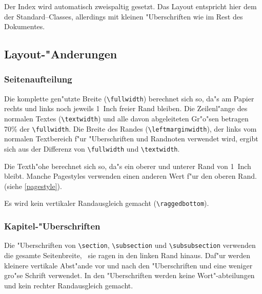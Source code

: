 Der Index wird automatisch zweispaltig gesetzt. Das Layout entspricht 
hier dem der Standard--Classes, allerdings mit kleinen "Uberschriften 
wie im Rest des Dokumentes.

\subsection{Layout-"Anderungen}

\subsubsection{Seitenaufteilung}

Die komplette gen"utzte Breite (\verb|\fullwidth|) berechnet 
sich so, da"s am Papier rechts und links noch jeweils 1~Inch 
freier Rand bleiben. Die Zeilenl"ange des normalen Textes 
(\verb|\textwidth|) und alle davon abgeleiteten Gr"o"sen 
betragen 70\% der \verb|\fullwidth|. Die Breite des Randes 
(\verb|\leftmarginwidth|), der links vom normalen Textbereich 
f"ur "Uberschriften und Randnoten verwendet wird, ergibt sich 
aus der Differenz von \verb|\fullwidth| und \verb|\textwidth|.

Die Texth"ohe berechnet sich so, da"s ein oberer und unterer Rand von 
1~Inch bleibt.
Manche Pagestyles verwenden einen anderen Wert f"ur den oberen Rand.
(siehe \ref{pagestyle}).

Es wird kein vertikaler Randausgleich gemacht (\verb|\raggedbottom|).

\subsubsection{Kapitel-"Uberschriften}

Die "Uberschriften von \verb|\section|, \verb|\subsection| und 
\verb|\subsubsection| verwenden die gesamte Seitenbreite, \dH\ sie 
ragen in den linken Rand hinaus. Daf"ur werden kleinere vertikale 
Abst"ande vor und nach den "Uberschriften und eine weniger gro"se 
Schrift verwendet. In den "Uberschriften werden keine Wort"-abteilungen 
und kein rechter Randausgleich gemacht.

